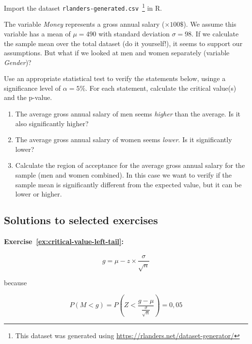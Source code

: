 \begin{exercise}
  \label{ex:z-test-rlanders}
  Import the dataset \texttt{rlanders-generated.csv}~\footnote{This dataset was generated using \url{https://rlanders.net/dataset-generator/}} in R.
  
  The variable \emph{Money} represents a gross annual salary ($\times 100\$$). We assume this variable has a mean of $\mu = 490$ with standard deviation $\sigma = 98$. If we calculate the sample mean over the total dataset (do it yourself!), it seems to support our assumptions. But what if we looked at men and women separately (variable \emph{Gender})?
  
  Use an appropriate statistical test to verify the statements below, usinge a significance level of $\alpha = 5\%$.
  For each statement, calculate the critical value(s) and the p-value.
  
  \begin{enumerate}
    \item The average gross annual salary of men seems \emph{higher} than the average. Is it also significantly higher?
    \item The average gross annual salary of women seems \emph{lower}. Is it significantly lower?
    \item Calculate the region of acceptance for the average gross annual salary for the sample (men and women combined). In this case we want to verify if the sample mean is significantly different from the expected value, but it can be lower or higher.
  \end{enumerate}
  
\end{exercise}

\subsection{Solutions to selected exercises}
\label{sec:testing-procedures-solutions}

\paragraph{Exercise~\ref{ex:critical-value-left-tail}:}

\begin{equation}
g = \mu - z \times \frac{\sigma}{\sqrt{n}}
\label{eq:kritiekeRechtseWaarde2}
\end{equation}

because

\[ P(M < g) = P\left(Z < \frac{g - \mu}{\frac{\sigma}{\sqrt{n}}}\right) = 0,05 \]

